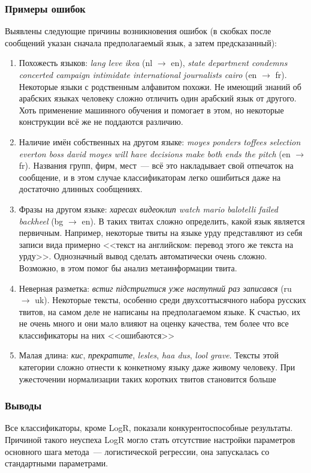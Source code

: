 \documentclass[a4paper, 14pt]{article}
\begin{document}
		\subsubsection{Примеры ошибок}
		Выявлены следующие причины возникновения ошибок (в скобках после сообщений указан сначала предполагаемый язык, а затем предсказанный):
		\begin{enumerate}
			\item Похожесть языков: \textit{lang leve ikea} (nl $\to$ en), 
				\textit{state department condemns concerted campaign intimidate international journalists cairo} (en $\to$ fr).
				Некоторые языки с родственным алфавитом похожи. Не имеющий знаний об арабских языках
				 человеку сложно отличить один арабский язык от другого. Хоть применение
				машинного обучения и помогает в этом, но некоторые конструкции всё же не поддаются различию.
			\item Наличие имён собственных на другом языке:
				\textit{moyes ponders toffees selection everton boss david moyes will have decisions make both ends the pitch} (en $\to$ fr).
				Названия групп, фирм, мест~--- всё это накладывает свой отпечаток на сообщение, и в этом случае классификаторам
				легко ошибиться даже на достаточно длинных сообщениях.
			\item Фразы на другом языке:
				\textit{харесах видеоклип watch mario balotelli failed backheel} (bg $\to$ en). В таких твитах сложно определить, какой
				язык является первичным. Например, некоторые твиты на языке урду представляют из себя записи вида примерно 
				<<текст на английском: перевод этого же текста на урду>>. Однозначный вывод сделать автоматически очень сложно. Возможно, в этом
				помог бы анализ метаинформации твита.
			\item Неверная разметка: 
				\textit{встиг підстригтися уже наступний раз записався} (ru $\to$ uk). Некоторые тексты, особенно среди двухсоттысячного набора 
				русских твитов, на самом деле не написаны на предполагаемом языке. К счастью, их не очень много и они мало влияют на оценку
				качества, тем более что все классификаторы на них <<ошибаются>>
			\item Малая длина:
				\textit{кис}, \textit{прекратите}, \textit{lesles}, \textit{haa dus}, \textit{lool grave}. Тексты этой категории сложно отнести
				к конкетному языку даже живому человеку. При ужесточении нормализации таких коротких твитов становится больше
		\end{enumerate}
	
		\subsubsection{Выводы}
		Все классификаторы, кроме LogR, показали конкурентоспособные результаты. Причиной такого неуспеха LogR могло стать отсутствие настройки параметров основного шага метода~--- логистической регрессии, она запускалась со стандартными параметрами.
		
\end{document}
